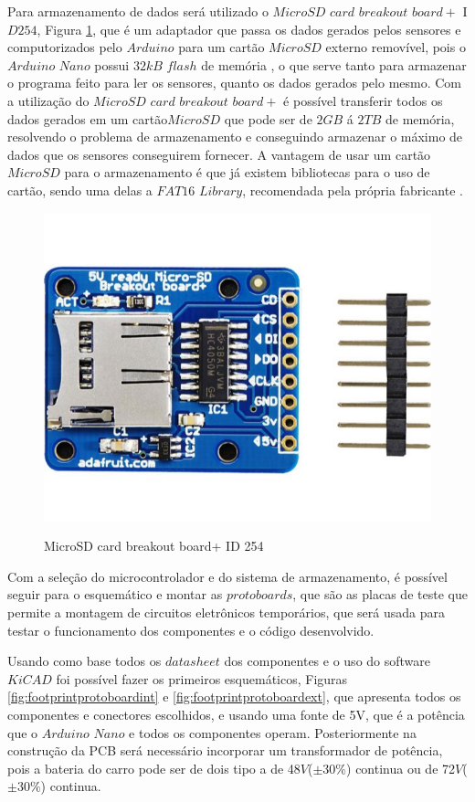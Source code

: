 \documentclass[acronym,symbols]{fei}
\begin{document}
Para armazenamento de dados será utilizado o $MicroSD$ $card$ $breakout$ $board+$ I$D 254$, Figura \ref{fig:FotomicroSD}, que é um adaptador que passa os dados gerados pelos sensores e computorizados pelo $Arduino$ para um cartão $MicroSD$ externo removível, pois o $Arduino$ $Nano$ possui $32kB$ $flash$ de memória \cite{UNO}, o que serve tanto para armazenar o programa feito para ler os sensores, quanto os dados gerados pelo mesmo. Com a utilização do $MicroSD$ $card$ $breakout$ $board+$ é possível transferir todos os dados gerados em um cartão$ MicroSD$ que pode ser de $2GB$ á $2TB$ de memória, resolvendo o problema de armazenamento e conseguindo armazenar o máximo de dados que os sensores conseguirem fornecer. A vantagem de usar um cartão $MicroSD$ para o armazenamento é que já existem bibliotecas para o uso de cartão, sendo uma delas a $FAT16$ $Library$, recomendada pela própria fabricante \textcite{254MicroSD}.

\begin{figure}[!htb]
\centering
    \caption{MicroSD card breakout board+ ID 254}
    \includegraphics[width=0.45\linewidth]{Imagens/Adafruit 254 Micro SD.jpg}
    \label{fig:FotomicroSD}
\end{figure}

Com a seleção do microcontrolador e do sistema de armazenamento, é possível seguir para o esquemático e montar as $protoboards$, que são as placas de teste que permite a montagem de circuitos eletrônicos temporários, que será usada para testar o funcionamento dos componentes e o código desenvolvido.

Usando como base todos os $datasheet$ dos componentes e o uso do software $KiCAD$ foi possível fazer os primeiros esquemáticos, Figuras \ref{fig:footprintprotoboardint} e \ref{fig:footprintprotoboardext}, que apresenta todos os componentes e conectores escolhidos, e usando uma fonte de 5V, que é a potência que o $Arduino$ $Nano$ e todos os componentes operam. Posteriormente na construção da PCB será necessário incorporar um transformador de potência, pois a bateria do carro pode ser de dois tipo a de 48$V$($\pm30\%$) continua  ou de 72$V$($\pm30\%$) continua.
\end{document}
